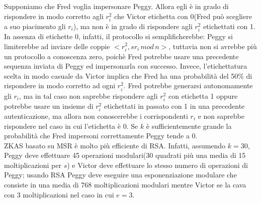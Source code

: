 Supponiamo che Fred voglia impersonare Peggy. Allora egli è in grado di rispondere in modo corretto agli $r_{i}^2$ che Victor etichetta con 0(Fred può scegliere a suo piacimento gli $r_{i}$), ma non è in grado di rispondere agli $r_{i}^2$ etichettati con 1. In assenza di etichette 0, infatti, il protocollo si semplificherebbe: Peggy si limiterebbe ad inviare delle coppie $<r_{i}^2, sr_{i} \, mod \, n>$, tuttavia non si avrebbe più un protocollo a conoscenza zero, poichè Fred potrebbe usare una precedente sequenza inviata di Peggy ed impersonarla con successo. Invece, l'etichettatura scelta in modo casuale da Victor implica che Fred ha una probabilità del 50\% di
rispondere in modo corretto ad ogni $r_{i}^2$. Fred potrebbe generarsi autonomamente gli $r_{i}$, ma in tal caso non saprebbe rispondere agli $r_{i}^2$ con etichetta 1 oppure potrebbe usare un insieme di $r_{i}^2$ etichettati in passato con 1 in una precedente autenticazione, ma allora non conoscerebbe i corrispondenti $r_{i}$ e non saprebbe rispondere nel caso in cui l'etichetta è 0. Se $k$ è sufficientemente grande la probabilità che Fred impersoni correttamente Peggy tende a 0. \\
ZKAS basato su MSR è molto più efficiente di RSA. Infatti, assumendo $k = 30$, Peggy deve effettuare 45 operazioni modulari(30
quadrati più una media di 15 moltiplicazioni per $s$) e Victor deve effettuare lo stesso numero di operazioni di Peggy; usando RSA Peggy deve eseguire una esponenziazione modulare che consiste in una media di 768 moltiplicazioni modulari mentre Victor se la cava con 3 moltiplicazioni nel caso in cui $e = 3$.